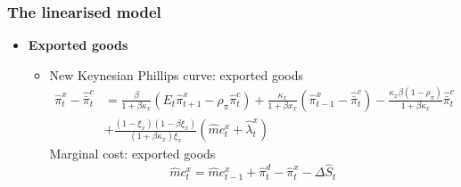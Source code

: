 \documentclass[9pt]{beamer}
\begin{document}
\begin{frame}[noframenumbering]
\frametitle{The linearised model}
\label{DomUnit3}
\begin{itemize}
    \item \textbf{Exported goods}
    \begin{itemize}
        \item 
New Keynesian Phillips curve: exported goods
$$
\begin{aligned}
\hat{\pi}_{t}^{x} - \hat{\bar{\pi}}_{t}^{c} &=\frac{\beta}{1+\beta \kappa_{x}}\left(E_{t} \hat{\pi}_{t+1}^{x}-\rho_{\pi} \hat{\pi}_{t}^{c}\right)+\frac{\kappa_{x}}{1+\beta x_{x}}\left(\hat{\pi}_{t-1}^{x}-\hat{\bar{\pi}}_{t}^{c}\right)-\frac{\kappa_{x} \beta\left(1-\rho_{\pi}\right)}{1+\beta \kappa_{x}} \hat{\bar{\pi}}_{t}^{c} \\
&+\frac{\left(1-\xi_{x}\right)\left(1-\beta \xi_{x}\right)}{\left(1+\beta \kappa_{x}\right) \xi_{x}}\left(\hat{m} c_{t}^{x}+\hat{\lambda}_{t}^{x}\right)
\end{aligned}
$$
Marginal cost: exported goods
$$
\hat{m} c_{t}^{x}=\hat{m} c_{t-1}^{x}+\hat{\pi}_{t}^{d}-\hat{\pi}_{t}^{x}-\Delta \hat{S}_{t}
$$

    
    \end{itemize}
    
    
\end{itemize}
\hyperlink{frame3}{}

\end{frame}
\end{document}
